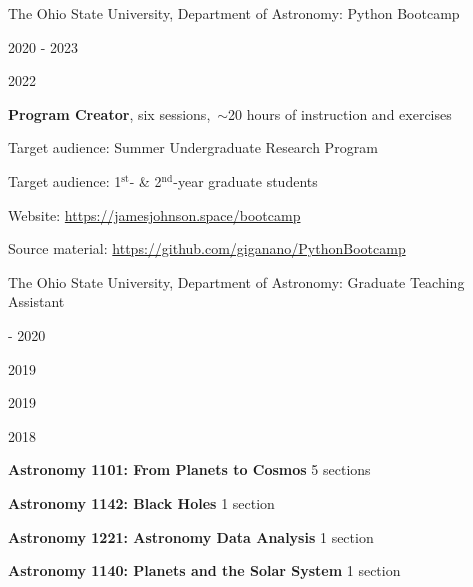 \documentclass[cv.tex]{subfiles}
\begin{document}
{\color{themecolor} \large The Ohio State University, Department of Astronomy:
Python Bootcamp}
\par\noindent
\parbox{0.18\textwidth}{%
	\vspace{2mm}
	\raggedleft
	\null \par
	2020 - 2023 \par
	2022 \par
	\null \par
	\null
}
\hspace{1mm}
\parbox{0.73\textwidth}{%
	\textbf{Program Creator}, six sessions,~$\sim$20 hours of instruction
	and exercises \par
	Target audience: Summer Undergraduate Research Program \par
	Target audience: 1$^\text{st}$- \& 2$^\text{nd}$-year graduate students \par
	Website: {\small \url{https://jamesjohnson.space/bootcamp}} \par
	Source material: 
	{\small \url{https://github.com/giganano/PythonBootcamp}}
}

\par\null\par\null\par\noindent
{\color{themecolor} \large The Ohio State University, Department of Astronomy:
Graduate Teaching Assistant}
\par\noindent
\parbox{0.18\textwidth}{%
	 - 2020 \par
	2019 \par
	2019 \par
	2018
}
\hspace{1mm}
\parbox{0.8\textwidth}{%
	\vspace{1mm}
	\textbf{Astronomy 1101: From Planets to Cosmos} \hfill 5 sections \par
	\textbf{Astronomy 1142: Black Holes} \hfill 1 section \par
	\textbf{Astronomy 1221: Astronomy Data Analysis} \hfill 1 section \par
	\textbf{Astronomy 1140: Planets and the Solar System} \hfill 1 section
}
\end{document}
